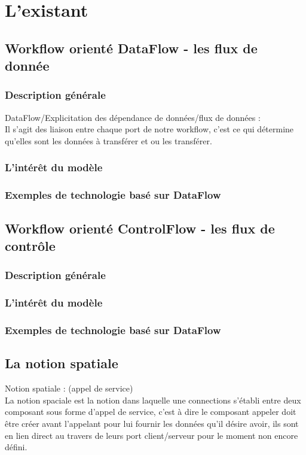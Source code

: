 \documentclass{article}
\begin{document}
\pagebreak



\iffalse
\section{L'existant}
\subsection{Workflow orienté DataFlow - les flux de donnée}
\subsubsection{Description générale}
DataFlow/Explicitation des dépendance de données/flux de données : \\
    Il s'agit des liaison entre chaque port de notre workflow, c'est ce qui détermine qu'elles sont les données à transférer et ou les transférer.
\subsubsection{L'intérêt du modèle}
\subsubsection{Exemples de technologie basé sur DataFlow}
\subsection{Workflow orienté ControlFlow - les flux de contrôle}
\subsubsection{Description générale}
\subsubsection{L'intérêt du modèle}
\subsubsection{Exemples de technologie basé sur DataFlow}
\subsection{La notion spatiale}
Notion spatiale : (appel de service)\\
    La notion spaciale est la notion dans laquelle une connections s'établi entre deux composant sous forme d'appel de service, c'est à dire le composant appeler doit être créer avant l'appelant pour lui fournir les données qu'il désire avoir, ils sont en lien direct au travers de leurs port client/serveur pour le moment non encore défini.
\end{document}
